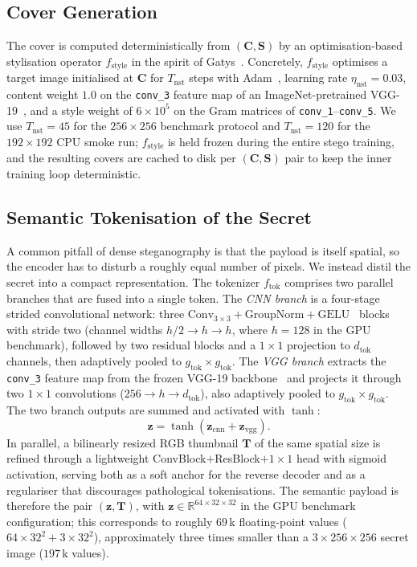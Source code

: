 \documentclass[runningheads]{llncs}
\begin{document}
\subsection{Cover Generation}
\label{sec:cover}
The cover is computed deterministically from $(\mathbf{C},\mathbf{S})$ by an optimisation-based stylisation operator $f_{\text{style}}$ in the spirit of Gatys~\cite{gatys}. Concretely, $f_{\text{style}}$ optimises a target image initialised at $\mathbf{C}$ for $T_{\text{nst}}$ steps with Adam~\cite{adam}, learning rate $\eta_{\text{nst}}\!=\!0.03$, content weight $1.0$ on the \texttt{conv\_3} feature map of an ImageNet-pretrained VGG-19~\cite{vgg}, and a style weight of $6\!\times\!10^{5}$ on the Gram matrices of \texttt{conv\_1}--\texttt{conv\_5}. We use $T_{\text{nst}}\!=\!45$ for the $256\!\times\!256$ benchmark protocol and $T_{\text{nst}}\!=\!120$ for the $192\!\times\!192$ CPU smoke run; $f_{\text{style}}$ is held frozen during the entire stego training, and the resulting covers are cached to disk per $(\mathbf{C},\mathbf{S})$ pair to keep the inner training loop deterministic.

\subsection{Semantic Tokenisation of the Secret}
\label{sec:tok}
A common pitfall of dense steganography is that the payload is itself spatial, so the encoder has to disturb a roughly equal number of pixels. We instead distil the secret into a compact representation. The tokenizer $f_{\text{tok}}$ comprises two parallel branches that are fused into a single token. The \emph{CNN branch} is a four-stage strided convolutional network: three $\text{Conv}_{3{\times}3}{+}\text{GroupNorm}{+}\text{GELU}$~\cite{gelu} blocks with stride two (channel widths $h/2 \!\to\! h \!\to\! h$, where $h\!=\!128$ in the GPU benchmark), followed by two residual blocks and a $1\!\times\!1$ projection to $d_{\text{tok}}$ channels, then adaptively pooled to $g_{\text{tok}}\!\times\!g_{\text{tok}}$. The \emph{VGG branch} extracts the \texttt{conv\_3} feature map from the frozen VGG-19 backbone~\cite{vgg} and projects it through two $1\!\times\!1$ convolutions ($256 \!\to\! h \!\to\! d_{\text{tok}}$), also adaptively pooled to $g_{\text{tok}}\!\times\!g_{\text{tok}}$. The two branch outputs are summed and activated with $\tanh$:
\begin{equation}
    \mathbf{z} = \tanh\!\left(\mathbf{z}_{\text{cnn}} + \mathbf{z}_{\text{vgg}}\right).
    \label{eq:tok}
\end{equation}
In parallel, a bilinearly resized RGB thumbnail $\mathbf{T}$ of the same spatial size is refined through a lightweight ConvBlock$+$ResBlock$+1\!\times\!1$ head with sigmoid activation, serving both as a soft anchor for the reverse decoder and as a regulariser that discourages pathological tokenisations. The semantic payload is therefore the pair $(\mathbf{z},\mathbf{T})$, with $\mathbf{z}\!\in\!\mathbb{R}^{64\times32\times32}$ in the GPU benchmark configuration; this corresponds to roughly $69$\,k floating-point values ($64\!\times\!32^{2}+3\!\times\!32^{2}$), approximately three times smaller than a $3\!\times\!256\!\times\!256$ secret image ($197$\,k values).
\end{document}
